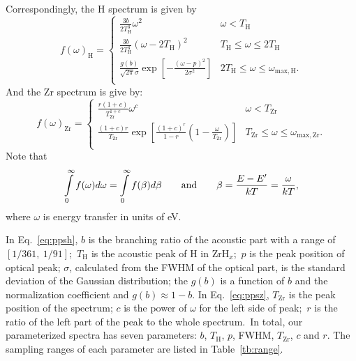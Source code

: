 \documentclass[review]{elsarticle}
\newcommand{\zh}{ZrH$_x$}
\newcommand{\tcb}[1]{{#1}}
\begin{document}
Correspondingly, the H spectrum is given by
\begin{equation}\label{eq:ppsh}
f(\omega)_\mathrm{H}=
\begin{cases}
\frac{3b}{2T_\mathrm{H}^3}\omega^2 & \omega<T_\mathrm{H}\\
\frac{3b}{2T_\mathrm{H}^3}(\omega-2T_\mathrm{H})^2 & T_\mathrm{H}\leq\omega\leq2T_\mathrm{H}\\
\frac{g(b)}{\sqrt{2\pi}\sigma}\exp\left[-\frac{(\omega-p)^2}{2\sigma^2}\right]& 2T_\mathrm{H}\leq\omega\leq\omega_\mathrm{max, H}.\\
\end{cases}
\end{equation}
And the Zr spectrum is give by:
\begin{equation}\label{eq:ppsz}
f(\omega)_\mathrm{Zr}=
\begin{cases}
\frac{r(1+c)}{T_\mathrm{Zr}^{1+c}}\omega^c & \omega<T_\mathrm{Zr}\\
\frac{(1+c)r}{T_\mathrm{Zr}}\exp\left[\frac{(1+c)^r}{1-r}(1-\frac{\omega}{T_\mathrm{Zr}})\right] & T_\mathrm{Zr}\leq\omega\leq\omega_\mathrm{max, Zr}.\\
\end{cases}
\end{equation}
Note that
\begin{equation}
\int\limits_{0}^{\infty}f(\omega)d\omega=\int\limits_{0}^{\infty}f(\beta)d\beta\text{\qquad and\qquad}\beta=\frac{E-E'}{kT}=\frac{\omega}{kT}\text{,}
\end{equation}
where $\omega$ is energy transfer in units of eV. 

\tcb{In Eq.~\eqref{eq:ppsh}, $b$ is the branching ratio of the acoustic part with a range of $\left[1/361,~1/91\right]$;~$T_\mathrm{H}$ is the acoustic peak of H in \zh;~$p$ is the peak position of optical peak; $\sigma$, calculated from the FWHM of the optical part, is the standard deviation of the Gaussian distribution; the $g(b)$ is a function of $b$ and the normalization coefficient and $g(b)\approx 1-b$. In Eq.~\eqref{eq:ppsz}, $T_\mathrm{Zr}$ is the peak position of the spectrum; $c$ is the power of $\omega$ for the left side of peak;~$r$ is the ratio of the left part of the peak to the whole spectrum.~In total, our parameterized spectra has seven parameters: $b$, $T_\mathrm{H}$, $p$, FWHM, $T_\mathrm{Zr}$, $c$ and $r$. The sampling ranges of each parameter are listed in Table\ \ref{tb:range}.}
\end{document}
